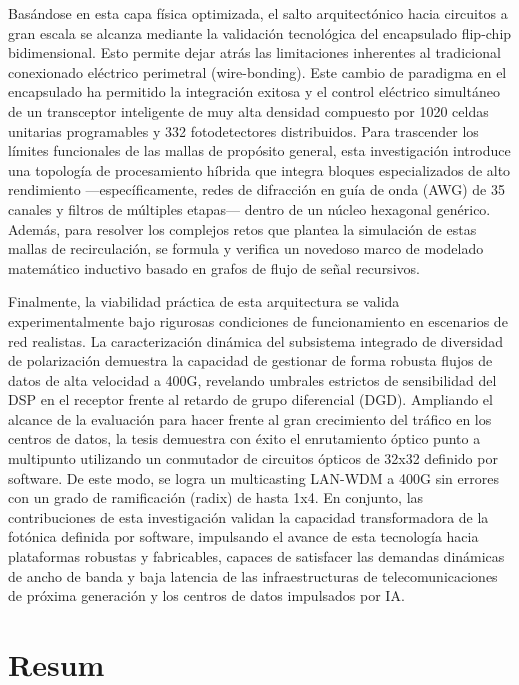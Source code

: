 Basándose en esta capa física optimizada, el salto arquitectónico hacia circuitos a gran escala se 
alcanza mediante la validación tecnológica del encapsulado flip-chip bidimensional. Esto permite 
dejar atrás las limitaciones inherentes al tradicional conexionado eléctrico perimetral 
(wire-bonding). Este cambio de paradigma en el encapsulado ha permitido la integración exitosa y el 
control eléctrico simultáneo de un transceptor inteligente de muy alta densidad compuesto por 1020 
celdas unitarias programables y 332 fotodetectores distribuidos. Para trascender los límites 
funcionales de las mallas de propósito general, esta investigación introduce una topología de 
procesamiento híbrida que integra bloques especializados de alto rendimiento —específicamente, 
redes de difracción en guía de onda (AWG) de 35 canales y filtros de múltiples etapas— dentro de un 
núcleo hexagonal genérico. Además, para resolver los complejos retos que plantea la simulación de 
estas mallas de recirculación, se formula y verifica un novedoso marco de modelado matemático 
inductivo basado en grafos de flujo de señal recursivos.

Finalmente, la viabilidad práctica de esta arquitectura se valida experimentalmente bajo rigurosas 
condiciones de funcionamiento en escenarios de red realistas. La caracterización dinámica del 
subsistema integrado de diversidad de polarización demuestra la capacidad de gestionar de forma 
robusta flujos de datos de alta velocidad a 400G, revelando umbrales estrictos de sensibilidad del 
DSP en el receptor frente al retardo de grupo diferencial (DGD). Ampliando el alcance de la 
evaluación para hacer frente al gran crecimiento del tráfico en los centros de datos, la tesis 
demuestra con éxito el enrutamiento óptico punto a multipunto utilizando un conmutador de circuitos 
ópticos de 32x32 definido por software. De este modo, se logra un multicasting LAN-WDM a 400G sin 
errores con un grado de ramificación (radix) de hasta 1x4. En conjunto, las contribuciones de esta 
investigación validan la capacidad transformadora de la fotónica definida por software, impulsando 
el avance de esta tecnología hacia plataformas robustas y fabricables, capaces de satisfacer las 
demandas dinámicas de ancho de banda y baja latencia de las infraestructuras de telecomunicaciones 
de próxima generación y los centros de datos impulsados por IA.


\chapter*{Resum}

